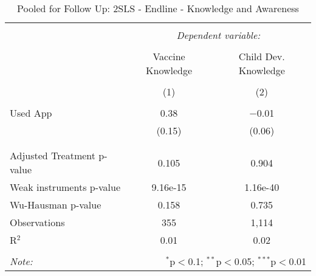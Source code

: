
\begin{table}[!htbp] \centering 
  \caption{Pooled for Follow Up: 2SLS - Endline - Knowledge and Awareness} 
  \label{tbl:Pooled for Follow Up: 2SLS - Endline - Knowledge and Awareness} 
\begin{tabular}{@{\extracolsep{5pt}}lcc} 
\\[-1.8ex]\hline 
\hline \\[-1.8ex] 
 & \multicolumn{2}{c}{\textit{Dependent variable:}} \\ 
\cline{2-3} 
\\[-1.8ex] & Vaccine Knowledge & Child Dev. Knowledge \\ 
\\[-1.8ex] & (1) & (2)\\ 
\hline \\[-1.8ex] 
 Used App & 0.38 & $-$0.01 \\ 
  & (0.15) & (0.06) \\ 
  & & \\ 
\hline \\[-1.8ex] 
Adjusted Treatment p-value & 0.105 & 0.904 \\ 
Weak instruments p-value & 9.16e-15 & 1.16e-40 \\ 
Wu-Hausman p-value & 0.158 & 0.735 \\ 
Observations & 355 & 1,114 \\ 
R$^{2}$ & 0.01 & 0.02 \\ 
\hline 
\hline \\[-1.8ex] 
\textit{Note:}  & \multicolumn{2}{r}{$^{*}$p$<$0.1; $^{**}$p$<$0.05; $^{***}$p$<$0.01} \\ 
\end{tabular} 
\end{table} 
